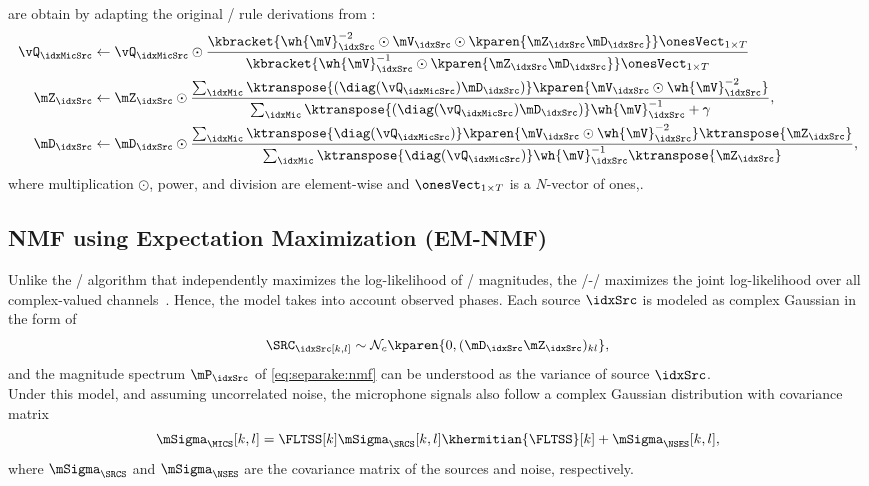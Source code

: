  are obtain by adapting the original \MU/ rule derivations from \citeauthor{ozerov2010multichannel}:
\begin{align}
    \vQ_{\idxMicSrc} &\gets\vQ_{\idxMicSrc} \odot \frac{\kbracket{\wh{\mV}_\idxSrc^{-2} \odot \mV_\idxSrc \odot \kparen{\mZ_\idxSrc \mD_\idxSrc}}\onesVect_{1\times T}}{
                                            \kbracket{\wh{\mV}_\idxSrc^{-1} \odot \kparen{\mZ_\idxSrc \mD_\idxSrc}}\onesVect_{1\times T}}\\
    \mZ_\idxSrc &\gets \mZ_\idxSrc \odot \frac{\sum_\idxMic \ktranspose{(\diag(\vQ_{\idxMicSrc}) \mD_\idxSrc)} \kparen{\mV_\idxSrc \odot \wh{\mV}_\idxSrc^{-2}}}{
                                            \sum_\idxMic \ktranspose{(\diag(\vQ_{\idxMicSrc}) \mD_\idxSrc)} \wh{\mV}_\idxSrc^{-1} + \gamma},\\
    \mD_\idxSrc &\gets \mD_\idxSrc \odot \frac{\sum_\idxMic \ktranspose{ \diag(\vQ_{\idxMicSrc})} \kparen{\mV_\idxSrc \odot \wh{\mV}_\idxSrc^{-2}}\ktranspose{\mZ_\idxSrc}}{
                                            \sum_\idxMic \ktranspose{ \diag(\vQ_{\idxMicSrc})} \wh{\mV}_\idxSrc^{-1} \ktranspose{\mZ_\idxSrc}},
\end{align}
where multiplication $\odot$, power, and division are element-wise and $\onesVect_{1\times T}$ is a $N$-vector of ones,.

\subsection{NMF using Expectation Maximization (EM-NMF)}\label{sec:separake:em}
Unlike the \MU/ algorithm that independently maximizes the log-likelihood of \RTF/ magnitudes, the \EM/-\NMF/ maximizes the joint log-likelihood over all complex-valued channels~.
Hence, the model takes into account observed phases.
Each source $\idxSrc$ is modeled as complex Gaussian in the form of
\begin{equation}
    \SRC_\idxSrc[k,l] \sim \mathcal{N}_c \kparen{0, (\mD_\idxSrc\mZ_\idxSrc)_{kl}},
\end{equation}
and the magnitude spectrum $\mP_\idxSrc$ of \eqref{eq:separake:nmf} can be understood as the variance of source $\idxSrc$.
\\Under this model, and assuming uncorrelated noise, the microphone signals also follow a complex Gaussian distribution with covariance matrix
\begin{equation}
    \mSigma_{\MICS}[k,l] = \FLTSS[k] \mSigma_{\SRCS} [k,l] \khermitian{\FLTSS}[k] + \mSigma_{\NSES}[k,l]
    ,
\end{equation}
where $\mSigma_{\SRCS}$ and $\mSigma_{\NSES}$ are the covariance matrix of the sources and noise, respectively.

